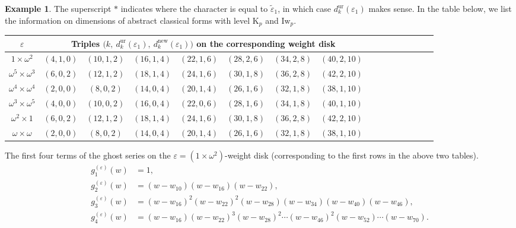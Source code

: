 \documentclass[12pt]{amsart}
\theoremstyle{definition}
\newtheorem{example}[subsection]{Example}
\numberwithin{equation}{subsection}
\def\rmK{\mathrm{K}}
\newcommand{\Iw}{\mathrm{Iw}}
\newcommand{\ur}{\mathrm{ur}}
\begin{document}
\begin{example}
The superscript $*$ indicates where the character is equal to $\tilde \varepsilon_1$, in which case $d_{k}^\ur(\varepsilon_1)$ makes sense.
In the table below, we list the information on dimensions of abstract classical forms with level $\rmK_p$ and $\Iw_p$.
\begin{center}
\begin{tabular}{|c|c|c|c|c|c|c|c|c|c|c|c|c|c|c|c|}
\hline
$\varepsilon$ & \multicolumn{7}{|c|}{Triples $\big(k, \ d_{k}^\ur(\varepsilon_1),\ d_{k}^{\textrm{new}}(\varepsilon_1)\big)$ on the corresponding weight disk}
\\
\hline
$1 \times \omega^2$ & 
 $(4, 1, 0)$  & $(10, 1, 2) $ & $(16, 1, 4)$ & $(22, 1, 6)$ & $(28, 2, 6)$ & $(34, 2,8)$ & $(40, 2, 10)$ \\
 \hline
 $\omega^5 \times \omega^3$ &
 $(6, 0, 2)$ & $(12, 1, 2)$ & $(18, 1, 4)$ & $(24, 1, 6)$ & $(30, 1, 8)$ & $(36, 2, 8)$ & $(42, 2, 10)$
\\ \hline
 $\omega^4 \times \omega^4$ &
  $(2,0,0)$  & $(8,0, 2)$ & $(14, 0, 4)$ & $(20, 1, 4)$ & $(26, 1, 6)$ & $(32, 1, 8)$ & $(38, 1, 10)$
\\ \hline
 $\omega^3 \times \omega^5$ &
$(4, 0, 0)$  & $(10, 0, 2) $ & $(16, 0, 4)$ & $(22, 0, 6)$ & $(28, 1, 6)$& $(34, 1,8)$ & $(40, 1, 10)$
\\ \hline
 $\omega^2 \times 1$ &
$(6, 0, 2)$ & $(12, 1, 2)$ & $(18, 1, 4)$ & $(24, 1, 6)$ & $(30, 1, 8)$& $(36, 2, 8)$ & $(42, 2, 10)$
\\ \hline
 $\omega \times \omega$ &
$(2,0,0)$  & $(8,0, 2)$ & $(14, 0, 4)$ & $(20, 1, 4)$ & $(26, 1, 6)$ & $(32, 1, 8)$ & $(38, 1, 10)$
\\ \hline
\end{tabular}
\end{center}

The first four terms of the ghost series on the $\varepsilon = (1 \times \omega^2)$-weight disk (corresponding to the first rows in the above two tables).
\begin{align*}
g_1^{(\varepsilon)}(w) &=1,
\\
g_2^{(\varepsilon)}(w) &=(w-w_{10})(w-w_{16})(w-w_{22}),
\\
g_3^{(\varepsilon)}(w) &=(w-w_{16})^2(w-w_{22})^2(w-w_{28})(w-w_{34})(w-w_{40})(w-w_{46}),
\\
g_4^{(\varepsilon)}(w) & = (w-w_{16})(w-w_{22})^3(w-w_{28})^2 \cdots (w-w_{46})^2(w-w_{52}) \cdots (w-w_{70}).
\end{align*}
\end{example}
\end{document}
